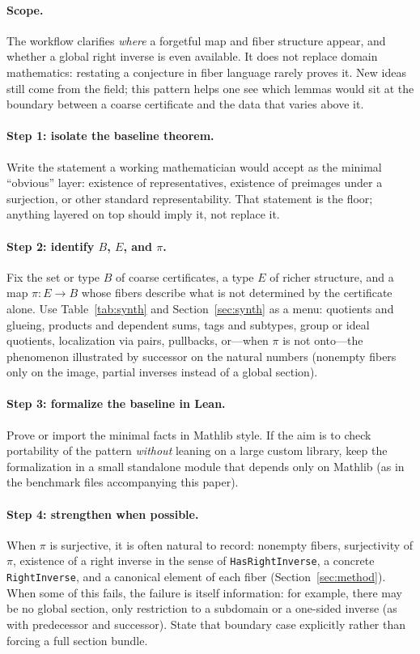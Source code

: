 \documentclass[11pt]{article}
\begin{document}
\paragraph{Scope.}
The workflow clarifies \emph{where} a forgetful map and fiber structure appear, and whether a
global right inverse is even available. It does not replace domain mathematics: restating a
conjecture in fiber language rarely proves it. New ideas still come from the field; this
pattern helps one see which lemmas would sit at the boundary between a coarse certificate and
the data that varies above it.

\paragraph{Step 1: isolate the baseline theorem.}
Write the statement a working mathematician would accept as the minimal ``obvious'' layer:
existence of representatives, existence of preimages under a surjection, or other standard
representability. That statement is the floor; anything layered on top should imply it, not
replace it.

\paragraph{Step 2: identify $B$, $E$, and $\pi$.}
Fix the set or type $B$ of coarse certificates, a type $E$ of richer structure, and a map
$\pi : E \to B$ whose fibers describe what is not determined by the certificate alone. Use
Table~\ref{tab:synth} and Section~\ref{sec:synth} as a menu: quotients and glueing, products
and dependent sums, tags and subtypes, group or ideal quotients, localization via pairs,
pullbacks, or---when $\pi$ is not onto---the phenomenon illustrated by successor on the natural
numbers (nonempty fibers only on the image, partial inverses instead of a global section).

\paragraph{Step 3: formalize the baseline in Lean.}
Prove or import the minimal facts in Mathlib style. If the aim is to check portability of the
pattern \emph{without} leaning on a large custom library, keep the formalization in a small
standalone module that depends only on Mathlib (as in the benchmark files accompanying this
paper).

\paragraph{Step 4: strengthen when possible.}
When $\pi$ is surjective, it is often natural to record: nonempty fibers, surjectivity of
$\pi$, existence of a right inverse in the sense of \texttt{HasRightInverse}, a concrete
\texttt{RightInverse}, and a canonical element of each fiber (Section~\ref{sec:method}). When
some of this fails, the failure is itself information: for example, there may be no global
section, only restriction to a subdomain or a one-sided inverse (as with predecessor and
successor). State that boundary case explicitly rather than forcing a full section bundle.
\end{document}
